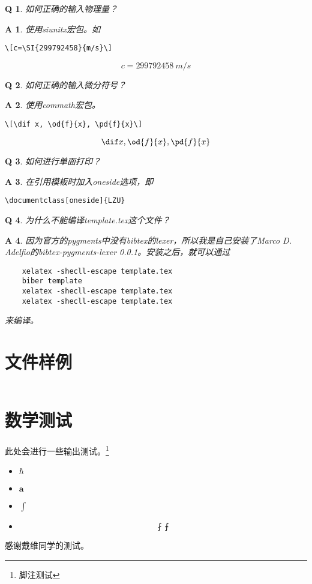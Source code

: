 \documentclass[oneside]{LZU}
\newcommand{\bvec}[1]{\symbf{#1}}
\newcommand{\filename}[1]{{\ttfamily #1}}
\newcommand{\package}[1]{{\sffamily #1}}
\newtheorem*{answer}{A}
\newtheorem{question}{Q}
\begin{document}
\begin{question}
    如何正确的输入物理量？
\end{question}
\begin{answer}
    使用\package{siunitx}宏包。如
\begin{verbatim}
\[c=\SI{299792458}{m/s}\]
\end{verbatim}
    \[c=\SI{299792458}{m/s}\]
\end{answer}
\begin{question}
    如何正确的输入微分符号？
\end{question}
\begin{answer}
    使用\package{commath}宏包。
\begin{verbatim}
\[\dif x, \od{f}{x}, \pd{f}{x}\]
\end{verbatim}
    \[\dif x, \od{f}{x}, \pd{f}{x}\]
\end{answer}
\begin{question}
    如何进行单面打印？
\end{question}
\begin{answer}
    在引用模板时加入oneside选项，即
\begin{verbatim}
\documentclass[oneside]{LZU}
\end{verbatim}
\end{answer}
\begin{question}
    为什么不能编译\filename{template.tex}这个文件？
    \label{qus:compilethisfile}
\end{question}
\begin{answer}
    因为官方的pygments中没有bibtex的lexer，所以我是自己安装了Marco D. Adelfio的bibtex-pygments-lexer 0.0.1\autocite{biblatexlexer}。安装之后，就可以通过
\begin{verbatim}
    xelatex -shecll-escape template.tex
    biber template
    xelatex -shecll-escape template.tex
    xelatex -shecll-escape template.tex
\end{verbatim}
来编译。
\end{answer}
\section{文件样例}
\label{sec:bibtex_examples}
\inputminted[breaklines,frame=single,linenos]{bibtex}{example.bib}
\section{数学测试}
此处会进行一些输出测试。\footnote{脚注测试}
\begin{itemize}
    \item $\hbar$
    \item $\bvec{a}$
    \item $\int$
    \item \[\fint\intbar\]
\end{itemize}
\Thanks
感谢戴维同学的测试。
\Grade
\end{document}
